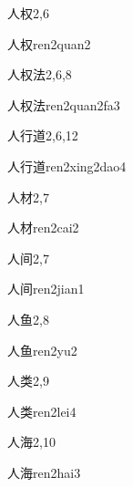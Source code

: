 \begin{entry}{人权}{2,6}
  \begin{phonetics}{人权}{ren2quan2}
  \end{phonetics}
\end{entry}

\begin{entry}{人权法}{2,6,8}
  \begin{phonetics}{人权法}{ren2quan2fa3}
  \end{phonetics}
\end{entry}

\begin{entry}{人行道}{2,6,12}
  \begin{phonetics}{人行道}{ren2xing2dao4}
  \end{phonetics}
\end{entry}

\begin{entry}{人材}{2,7}
  \begin{phonetics}{人材}{ren2cai2}
  \end{phonetics}
\end{entry}

\begin{entry}{人间}{2,7}
  \begin{phonetics}{人间}{ren2jian1}
  \end{phonetics}
\end{entry}

\begin{entry}{人鱼}{2,8}
  \begin{phonetics}{人鱼}{ren2yu2}
  \end{phonetics}
\end{entry}

\begin{entry}{人类}{2,9}
  \begin{phonetics}{人类}{ren2lei4}
  \end{phonetics}
\end{entry}

\begin{entry}{人海}{2,10}
  \begin{phonetics}{人海}{ren2hai3}
  \end{phonetics}
\end{entry}

